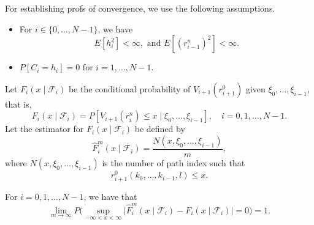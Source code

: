 \documentclass[reqno]{amsart}
\begin{document}
For  establishing profs of convergence, we use the following assumptions.
\begin{itemize}  %
\item[(A1)] For $i \in\{0, \dots, N-1\}$, we have
\[
 E[h_i^2]<\infty, \text{ and } E[\left(r_{i-1}^n\right)^2]<\infty .
\]
\item[(A2)] %
 $P[C_i=h_i]=0$ for $i=1, \dots, N-1$.
\end{itemize}
Let $F_i\left(x\mid \mathcal{F}_i \right)$ be the conditional probability of 
$V_{i+1}\left(r_{i+1}^0\right)$ given $\xi_0,\dots,\xi_{i-1}$, that is,
\[
 F_i\left(x\mid \mathcal{F}_i \right)
 =P[V_{i+1}\left(r_{i}^n\right) \leq x \mid \xi_0,\dots,\xi_{i-1}], \quad
 i=0,1, \dots, N-1 .
\]
Let the estimator for $F_i\left(x\mid \mathcal{F}_i \right)$ be defined by
\[
 \hat{F}_i^m\left(x\mid \mathcal{F}_i \right)
 =\frac{N\left(x, \xi_0,\dots,\xi_{i-1}\right)}{m},
\]
where $N\left(x, \xi_0,\dots,\xi_{i-1}\right)$ is the number of path index such that
\[
 r_{i+1}^{0}\left(k_0,\dots,k_{i-1},l\right) \leq x.
\]

\begin{lemma} \label{FF}
 For $i=0,1, \dots, N-1$, we have that
\[
 \lim _{m \to \infty} P\Big( \sup _{-\infty<x<\infty}
 \big|\hat{F}_i^m\left(x\mid \mathcal{F}_i \right)-F_i\left(x\mid \mathcal{F}_i 
 \right)\big|=0\Big)=1.
\]
\end{lemma}
\end{document}
